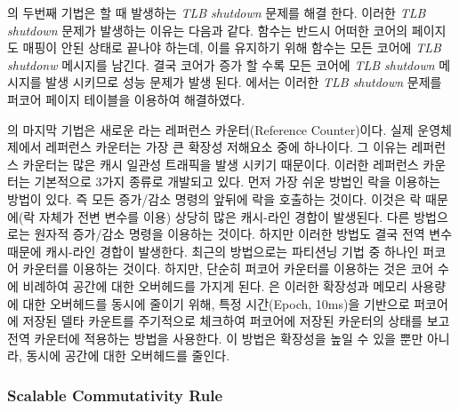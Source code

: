 의 두번째 기법은 할 때 발생하는 \textit{TLB shutdown} 문제를 해결 한다.
이러한 \textit{TLB shutdown} 문제가 발생하는 이유는 다음과 같다. 
 함수는 반드시 어떠한 코어의 페이지도 
매핑이 안된 상태로 끝나야 하는데, 이를 유지하기 위해 
함수는 모든 코어에 \textit{TLB shutdonw} 메시지를 남긴다.
결국 코어가 증가 할 수록 모든 코어에
\textit{TLB shutdown} 메시지를 발생 시키므로 성능 문제가 발생 된다.
에서는 이러한 \textit{TLB shutdown} 문제를 퍼코어 페이지 테이블을 이용하여 해결하였다. 

의 마지막 기법은 새로운 라는 레퍼런스 카운터(Reference Counter)이다. 
실제 운영체제에서 레퍼런스 카운터는 가장 큰 확장성 저해요소 중에 하나이다.
그 이유는 레퍼런스 카운터는 많은 캐시 일관성 트래픽을 발생 시키기 때문이다.
이러한 레퍼런스 카운터는 기본적으로 3가지 종류로 개발되고 있다. 
먼저 가장 쉬운 방법인 락을 이용하는 방법이 있다. 
즉 모든 증가/감소 명령의 앞뒤에 락을 호출하는 것이다. 
이것은 락 때문에(락 자체가 전변 변수를 이용) 상당히 많은 캐시-라인 경합이 발생된다. 
다른 방법으로는 원자적 증가/감소 명령을 이용하는 것이다. 
하지만 이러한 방법도 결국 전역 변수 때문에 캐시-라인 경합이 발생한다. 
최근의 방법으로는 파티션닝 기법 중 하나인 퍼코어 카운터를 이용하는 것이다. 
하지만, 단순히 퍼코어 카운터를 이용하는 것은 코어 수에 비례하여 공간에 대한 오버헤드를 가지게 된다.
은 이러한 확장성과 메모리 사용량에 대한 오버헤드를 동시에 줄이기 위해, 
특정 시간(Epoch, 10ms)을 기반으로 퍼코어에 저장된 델타 카운트를 
주기적으로 체크하여 퍼코어에 저장된 카운터의 상태를 보고 전역 카운터에 적용하는 방법을 사용한다.
이 방법은 확장성을 높일 수 있을 뿐만 아니라, 동시에 공간에 대한 오버헤드를 줄인다. 

\subsubsection{Scalable Commutativity Rule}

